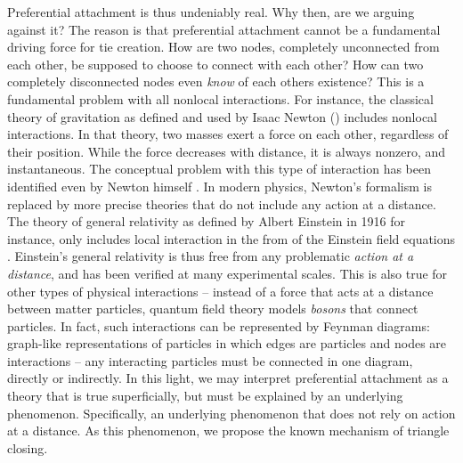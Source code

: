 \documentclass{jimis}
\begin{document}
Preferential attachment is thus undeniably real.  Why then, are we
arguing against it?
The reason is that preferential attachment cannot be a fundamental
driving force for tie creation. 
How are two nodes, completely unconnected from each
other, be supposed to choose to connect with each other?  How can two
completely disconnected nodes even \emph{know} of each others existence?
This is a fundamental problem with all nonlocal interactions.  For
instance, the classical theory of gravitation as defined and used by
Isaac Newton (\citeyear{newton}) includes nonlocal interactions.  In that
theory, two masses exert a force on each other, regardless of their
position.  While the force decreases with distance, it is always
nonzero, and instantaneous.  The conceptual problem with this type of
interaction has been identified even by Newton himself
\citep{hesse}.  In modern physics, Newton's formalism is replaced by more
precise theories that do not include any action at a distance.  The
theory of general relativity as defined by Albert Einstein in 1916 for
instance, only includes local interaction in the from of the Einstein
field equations \citep{einstein}.  Einstein's general relativity is
thus free from any problematic \emph{action at a distance}, and has been
verified at many experimental scales.  This is also true for
other types of physical interactions -- instead of a force that acts at
a distance between matter particles, quantum field theory models
\emph{bosons} that connect 
particles.  In fact, such interactions can be represented by Feynman
diagrams: graph-like representations of particles in which edges are
particles and nodes are interactions -- any interacting particles must
be connected in one diagram, directly or indirectly.  In this light, we
may interpret preferential attachment as a theory that is true
superficially, but must be explained by an underlying phenomenon.
Specifically, an underlying phenomenon that does not rely on action at a
distance.  As this phenomenon, we propose the known mechanism of
triangle closing.
\end{document}
